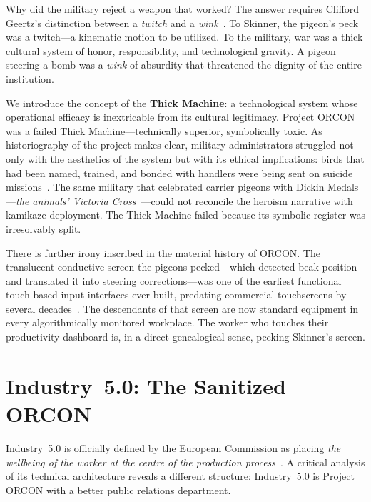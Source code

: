 \documentclass[runningheads]{llncs}
\begin{document}
Why did the military reject a weapon that worked? The answer requires Clifford
Geertz's distinction between a \emph{twitch} and a
\emph{wink}~\cite{geertz1973interpretation}. To Skinner, the pigeon's peck was
a twitch---a kinematic motion to be utilized. To the military, war was a thick
cultural system of honor, responsibility, and technological gravity. A pigeon
steering a bomb was a \emph{wink} of absurdity that threatened the dignity of
the entire institution.

We introduce the concept of the \textbf{Thick Machine}: a technological system
whose operational efficacy is inextricable from its cultural legitimacy. Project
ORCON was a failed Thick Machine---technically superior, symbolically toxic. As
historiography of the project makes clear, military administrators struggled not
only with the aesthetics of the system but with its ethical implications: birds
that had been named, trained, and bonded with handlers were being sent on
suicide missions~\cite{pigeonbombs2025,warpeace2025}. The same military that
celebrated carrier pigeons with Dickin Medals---\emph{the animals' Victoria
Cross}~\cite{warpeace2025}---could not reconcile the heroism narrative with
kamikaze deployment. The Thick Machine failed because its symbolic register was
irresolvably split.

There is further irony inscribed in the material history of ORCON. The
translucent conductive screen the pigeons pecked---which detected beak position
and translated it into steering corrections---was one of the earliest functional
touch-based input interfaces ever built, predating commercial touchscreens by
several decades~\cite{pigeonbombs2025}. The descendants of that screen are now
standard equipment in every algorithmically monitored workplace. The worker who
touches their productivity dashboard is, in a direct genealogical sense,
pecking Skinner's screen.

\section{Industry~5.0: The Sanitized ORCON}

Industry~5.0 is officially defined by the European Commission as placing
\emph{the wellbeing of the worker at the centre of the production
process}~\cite{breque2021industry}. A critical analysis of its technical
architecture reveals a different structure: Industry~5.0 is Project ORCON with
a better public relations department.
\end{document}
